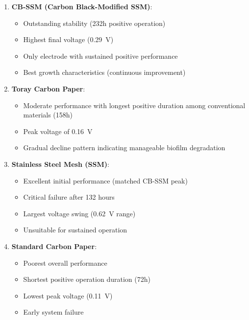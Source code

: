 \documentclass[12pt,a4paper]{article}
\begin{document}
\begin{enumerate}
    \item \textbf{CB-SSM (Carbon Black-Modified SSM)}: 
    \begin{itemize}
        \item Outstanding stability (232h positive operation)
        \item Highest final voltage (\SI{+0.29}{\volt})
        \item Only electrode with sustained positive performance
        \item Best growth characteristics (continuous improvement)
    \end{itemize}
    
    \item \textbf{Toray Carbon Paper}: 
    \begin{itemize}
        \item Moderate performance with longest positive duration among conventional materials (158h)
        \item Peak voltage of \SI{+0.16}{\volt}
        \item Gradual decline pattern indicating manageable biofilm degradation
    \end{itemize}
    
    \item \textbf{Stainless Steel Mesh (SSM)}: 
    \begin{itemize}
        \item Excellent initial performance (matched CB-SSM peak)
        \item Critical failure after 132 hours
        \item Largest voltage swing (\SI{0.62}{\volt} range)
        \item Unsuitable for sustained operation
    \end{itemize}
    
    \item \textbf{Standard Carbon Paper}: 
    \begin{itemize}
        \item Poorest overall performance
        \item Shortest positive operation duration (72h)
        \item Lowest peak voltage (\SI{+0.11}{\volt})
        \item Early system failure
    \end{itemize}
\end{enumerate}
\end{document}
